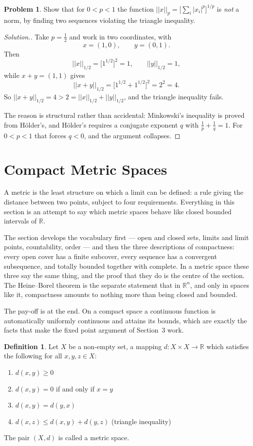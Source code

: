 \documentclass[11pt,a4paper]{article}
\theoremstyle{definition}
\newtheorem{defn}[thm]{Definition}
\newtheorem{problemx}{Problem}[section]
\newenvironment{problem}{\begin{problemx}}{\end{problemx}}
\newenvironment{solution}
  {\renewcommand{\qedsymbol}{}\begin{proof}[\textit{Solution}.]}
  {\end{proof}}
\begin{document}
\begin{problem}
Show that for $0<p<1$ the function
$||x||_p=\big[\sum_i |x_i|^p\big]^{1/p}$ is \emph{not} a norm, by finding two
sequences violating the triangle inequality.
\end{problem}
\begin{solution}
Take $p=\frac12$ and work in two coordinates, with
$$x=(1,0),\qquad y=(0,1).$$
Then
$$||x||_{1/2}=\big[1^{1/2}\big]^{2}=1,\qquad ||y||_{1/2}=1 ,$$
while $x+y=(1,1)$ gives
$$||x+y||_{1/2}=\big[1^{1/2}+1^{1/2}\big]^{2}=2^{2}=4 .$$
So $||x+y||_{1/2}=4>2=||x||_{1/2}+||y||_{1/2}$, and the triangle inequality
fails.

The reason is structural rather than accidental: Minkowski's inequality is
proved from H\"older's, and H\"older's requires a conjugate exponent $q$ with
$\frac1p+\frac1q=1$. For $0<p<1$ that forces $q<0$, and the argument collapses.
\end{solution}


\pagebreak


\section{Compact Metric Spaces}
A metric is the least structure on which a limit can be defined: a rule giving
the distance between two points, subject to four requirements. Everything in
this section is an attempt to say which metric spaces behave like closed
bounded intervals of $\mathbb{R}$.

The section develops the vocabulary first --- open and closed sets, limits and
limit points, countability, order --- and then the three descriptions of
compactness: every open cover has a finite subcover, every sequence has a
convergent subsequence, and totally bounded together with complete. In a metric
space these three say the same thing, and the proof that they do is the centre
of the section. The Heine--Borel theorem is the separate statement that in
$\mathbb{R}^n$, and only in spaces like it, compactness amounts to nothing more
than being closed and bounded.

The pay-off is at the end. On a compact space a continuous function is
automatically uniformly continuous and attains its bounds, which are exactly the
facts that make the fixed point argument of Section~3 work.

\begin{defn}
Let $X$ be a non-empty set, a mapping $d:X\times X\rightarrow \mathbb{R}$ which satisfies the following for all $x,y,z\in X$:
\begin{enumerate}
\item[i] $d(x,y)\geq 0$
\item[ii] $d(x,y)=0$ if and only if $x=y$
\item[iii] $d(x,y)=d(y,x)$
\item[iv] $d(x,z)\leq d(x,y)+d(y,z)$ (triangle inequality)
\end{enumerate}
The pair $(X,d)$ is called a metric space.

\end{defn}
\end{document}
